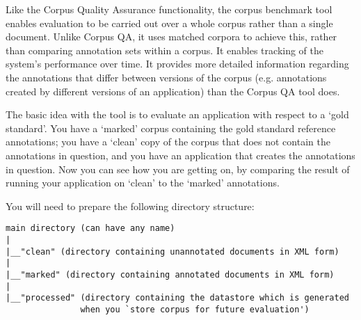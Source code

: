 Like the Corpus Quality Assurance functionality, the corpus benchmark tool
 enables evaluation to be carried out over a whole corpus rather than a
single document. Unlike Corpus QA, it uses matched corpora to achieve this,
rather than comparing annotation sets within a corpus. It enables tracking of the
system's performance over time. It provides more detailed information regarding
the annotations that differ between versions of the corpus (e.g. annotations
created by different versions of an application) than the Corpus QA tool does.

The basic idea with the tool is to evaluate an application with respect to a
`gold standard'. You have a `marked' corpus containing the gold standard
reference annotations; you have a `clean' copy of the corpus that does not
contain the annotations in question, and you have an application that creates the
annotations in question. Now you can see how you are getting on, by comparing the
result of running your application on `clean' to the `marked' annotations.


You will need to prepare the following directory structure:

\begin{small}
\begin{verbatim}
main directory (can have any name)
|
|__"clean" (directory containing unannotated documents in XML form)
|
|__"marked" (directory containing annotated documents in XML form)
|
|__"processed" (directory containing the datastore which is generated
               when you `store corpus for future evaluation')
\end{verbatim}\end{small}

